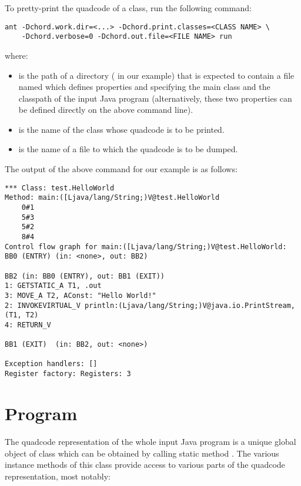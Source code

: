 To pretty-print the quadcode of a class, run the following command:

\begin{framed}
\begin{verbatim}
ant -Dchord.work.dir=<...> -Dchord.print.classes=<CLASS NAME> \
    -Dchord.verbose=0 -Dchord.out.file=<FILE NAME> run
\end{verbatim}
\end{framed}

where:

\begin{itemize}
\item
{} is the path of a directory ( in our example) that is expected to
contain a file named \code{chord.properties} which defines
properties  and 
specifying the main class and the classpath of the input Java program
(alternatively, these two properties can be defined directly on the
above command line).
\item
{\tt <CLASS NAME>} is the name of the class whose quadcode is to be
printed.
\item
{\tt <FILE NAME>} is the name of a file to which the quadcode is to be
dumped.
\end{itemize}

The output of the above command for our example is as follows:

\begin{framed}
\begin{verbatim}
*** Class: test.HelloWorld
Method: main:([Ljava/lang/String;)V@test.HelloWorld
    0#1
    5#3
    5#2
    8#4
Control flow graph for main:([Ljava/lang/String;)V@test.HelloWorld:
BB0 (ENTRY) (in: <none>, out: BB2)

BB2 (in: BB0 (ENTRY), out: BB1 (EXIT))
1: GETSTATIC_A T1, .out
3: MOVE_A T2, AConst: "Hello World!"
2: INVOKEVIRTUAL_V println:(Ljava/lang/String;)V@java.io.PrintStream, (T1, T2)
4: RETURN_V

BB1 (EXIT)  (in: BB2, out: <none>)

Exception handlers: []
Register factory: Registers: 3
\end{verbatim}
\end{framed}

\section{Program}

The quadcode representation of the whole input Java program is a
unique global object of
class 
which can be obtained by calling static
method .
The various instance methods of this class provide access to various
parts of the quadcode representation, most notably:

